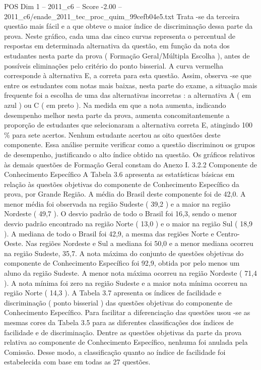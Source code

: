 \begin{textsample}{POS Dim 1 – 2011\_c6 – Score -2.00 – 2011\_c6/enade\_2011\_tec\_proc\_quim\_99cefb04e5.txt}
Trata -se da terceira questão mais fácil e a que obteve o maior índice de discriminação dessa parte da prova.
Neste gráfico, cada uma das cinco curvas representa o percentual de respostas em determinada alternativa da questão, em função da nota dos estudantes nesta parte da prova ( Formação Geral/Múltipla Escolha ), antes de possíveis eliminações pelo critério do ponto bisserial.
A curva vermelha corresponde à alternativa E, a correta para esta questão.
Assim, observa -se que entre os estudantes com notas mais baixas, nesta parte do exame, a situação mais frequente foi a escolha de uma das alternativas incorretas : a alternativa A ( em azul ) ou C ( em preto ).
Na medida em que a nota aumenta, indicando desempenho melhor nesta parte da prova, aumenta concomitantemente a proporção de estudantes que selecionaram a alternativa correta E, atingindo 100 \% para sete acertos.
Nenhum estudante acertou as oito questões deste componente.
Essa análise permite verificar como a questão discriminou os grupos de desempenho, justificando o alto índice obtido na questão.
Os gráficos relativos às demais questões de Formação Geral constam do Anexo I. 3.2.2 Componente de Conhecimento Específico A Tabela 3.6 apresenta as estatísticas básicas em relação às questões objetivas do componente de Conhecimento Específico da prova, por Grande Região.
A média do Brasil deste componente foi de 42,0.
A menor média foi observada na região Sudeste ( 39,2 ) e a maior na região Nordeste ( 49,7 ).
O desvio padrão de todo o Brasil foi 16,3, sendo o menor desvio padrão encontrado na região Norte ( 13,0 ) e o maior na região Sul ( 18,9 ).
A mediana de todo o Brasil foi 42,9, a mesma das regiões Norte e Centro-Oeste.
Nas regiões Nordeste e Sul a mediana foi 50,0 e a menor mediana ocorreu na região Sudeste, 35,7.
A nota máxima do conjunto de questões objetivas do componente de Conhecimento Específico foi 92,9, obtida por pelo menos um aluno da região Sudeste.
A menor nota máxima ocorreu na região Nordeste ( 71,4 ).
A nota mínima foi zero na região Sudeste e a maior nota mínima ocorreu na região Norte ( 14,3 ).
A Tabela 3.7 apresenta os índices de facilidade e discriminação ( ponto bisserial ) das questões objetivas do componente de Conhecimento Específico.
Para facilitar a diferenciação das questões usou -se as mesmas cores da Tabela 3.5 para as diferentes classificações dos índices de facilidade e de discriminação.
Dentre as questões objetivas da parte da prova relativa ao componente de Conhecimento Específico, nenhuma foi anulada pela Comissão.
Desse modo, a classificação quanto ao índice de facilidade foi estabelecida com base em todas as 27 questões.

\end{textsample}
